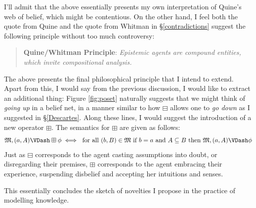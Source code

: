 \documentclass[11pt]{article}
\numberwithin{equation}{subsection}
\renewcommand{\Omega}{\mathfrak{M}}
\newcommand{\BM}{\boxminus}
\newcommand{\BP}{\boxplus}
\begin{document}
I'll admit that the above essentially presents my own interpretation
of Quine's web of belief, which might be contentious.  On the other
hand, I feel both the quote from Quine and the quote from Whitman in
\S\ref{contradictions} suggest the following principle without too
much controversy:
\begin{quote}
 \textbf{Quine/Whitman Principle}: \emph{Epistemic agents are compound
   entities, which invite compositional analysis.}
\end{quote}
The above presents the final philosophical principle that I intend to
extend.  Apart from this, I would say from the previous discussion, I
would like to extract an additional thing:  Figure \ref{fig:poset}
naturally suggests that we might think of \emph{going up} in a belief
net, in a manner similar to how $\BM$ allows one to \emph{go down} as
I suggested in \S\ref{Descartes}. Along these lines, I would suggest
the introduction of a new operator $\BP$.  The semantics for $\BP$ are
given as follows:
\[ \Omega,(a,A) \VDash \BP \phi \iff \textup{ for all }
(b,B)\in\Omega\textup{ if } b = a \textup{ and } A\subseteq B \textup{
  then } \Omega,(a,A) \VDash \phi \]
Just as $\BM$ corresponds to the agent casting assumptions into doubt,
or disregarding their premises, $\BP$ corresponds to the agent
embracing their experience, suspending disbelief and accepting her
intuitions and senses.

This essentially concludes the sketch of novelties I propose in the
practice of modelling knowledge.
\end{document}
